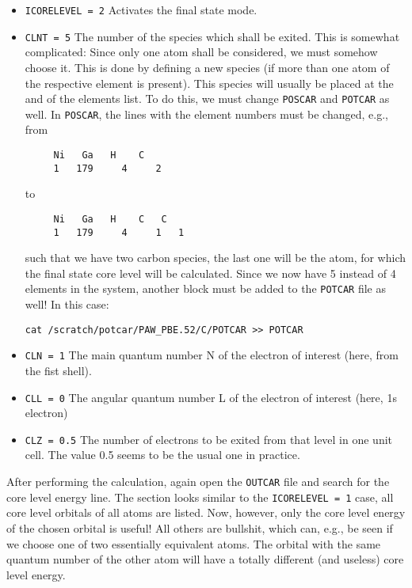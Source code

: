 \documentclass[a4paper,11pt]{article}
\begin{document}
\begin{itemize}
 \item \texttt{ICORELEVEL = 2}  Activates the final state mode.
 \item \texttt{CLNT = 5} The number of the species which shall be exited. This is somewhat
 complicated: Since only one atom shall be considered, we must somehow choose it. This 
 is done by defining a new species (if more than one atom of the respective element is 
 present). This species will usually be placed at the and of the elements list.
 To do this, we must change \texttt{POSCAR} and \texttt{POTCAR} as well.
 In \texttt{POSCAR}, the lines with the element numbers must be changed, e.g., from
 \begin{verbatim}
     Ni   Ga   H    C
     1   179     4     2
 \end{verbatim}
 to
 \begin{verbatim}
     Ni   Ga   H    C   C
     1   179     4     1   1
 \end{verbatim}
such that we have two carbon species, the last one will be the atom, for which the final
state core level will be calculated.
Since we now have 5 instead of 4 elements in the system, another block must be added 
to the \texttt{POTCAR} file as well! In this case:

       \begin{verbatim}
cat /scratch/potcar/PAW_PBE.52/C/POTCAR >> POTCAR
       \end{verbatim}

  \item \texttt{CLN = 1} The main quantum number N of the electron of interest (here, from the 
  fist shell).
  \item \texttt{CLL = 0} The angular quantum number L of the electron of interest 
  (here, 1s electron) 
  \item \texttt{CLZ = 0.5} The number of electrons to be exited from that level in one 
  unit cell. The value 0.5 seems to be the usual one in practice.
\end{itemize}

After performing the calculation, again open the \texttt{OUTCAR} file and search
for the core level energy line.
The section looks similar to the \texttt{ICORELEVEL = 1} case, all core level
orbitals of all atoms are listed.
Now, however, only the core level energy of the chosen orbital is useful! All others are 
bullshit, which can, e.g., be seen if we choose one of two essentially equivalent 
atoms. The orbital with the same quantum number of the other atom will have 
a totally different (and useless) core level energy.
\end{document}
